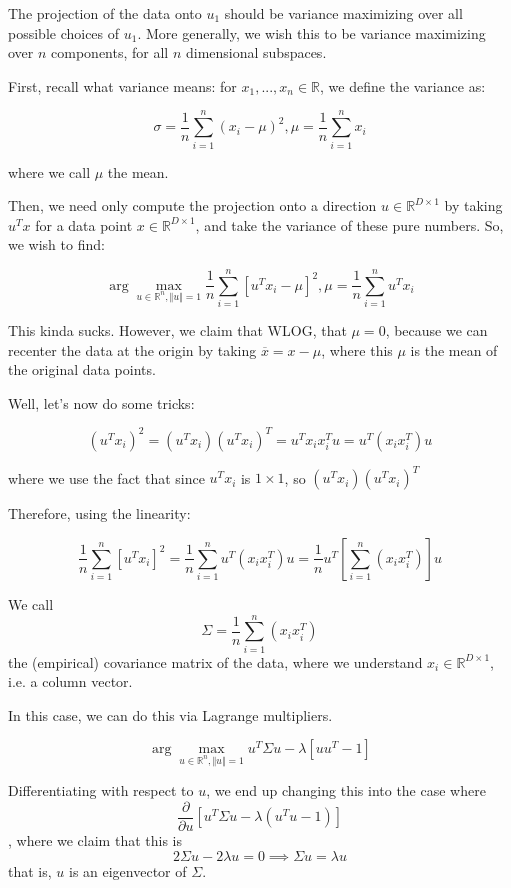 \documentclass[10pt]{article}
\begin{document}
The projection of the data onto $u_1$ should be variance maximizing over all possible choices of $u_1$. More generally, we wish this to be variance maximizing over $n$ components, for all $n$ dimensional subspaces.

First, recall what variance means: for $x_1,...,x_n \in \mathbb{R}$, we define the variance as:

$$ \sigma =  \frac{1}{n} \sum_{i=1}^n (x_i - \mu )^2,  \mu = \frac{1}{n} \sum_{i=1}^n x_i $$

where we call $\mu$ the mean. 

Then, we need only compute the projection onto a direction $u \in \mathbb{R}^{D \times 1}$ by taking $u^T x$ for a data point $x \in \mathbb{R}^{D \times 1}$, and take the variance of these pure numbers. So, we wish to find:

$$ \arg\max_{u \in \mathbb{R}^n, \Vert u \Vert = 1} \frac{1}{n} \sum_{i=1}^n [u^T x_i - \mu ]^2, \mu = \frac{1}{n} \sum_{i=1}^n u^T x_i $$

This kinda sucks. However, we claim that WLOG, that $\mu = 0$, because we can recenter the data at the origin by taking $\overline{x} = x - \mu$, where this $\mu$ is the mean of the original data points.

Well, let’s now do some tricks:

$$ (u^T x_i)^2  = (u^T x_i )(u^T x_i)^T = u^T x_i x_i^T u = u^T (x_i x_i^T) u$$

where we use the fact that since $u^T x_i$ is $1 \times 1$, so $(u^T x_i )(u^T x_i)^T$

Therefore, using the linearity:

$$  \frac{1}{n} \sum_{i=1}^n [u^T x_i ]^2 =  \frac{1}{n} \sum_{i=1}^n  u^T (x_i x_i^T) u = \frac{1}{n} u^T \left[ \sum_{i=1}^n (x_i x_i^T) \right] u $$

We call $$ \Sigma = \frac{1}{n} \sum_{i=1}^n (x_i x_i^T)$$ the (empirical) covariance matrix of the data, where we understand $x_i \in \mathbb{R}^{D \times 1}$, i.e. a column vector.

In this case, we can do this via Lagrange multipliers.

$$ \arg\max_{u \in \mathbb{R}^n, \Vert u \Vert = 1} u^T \Sigma u - \lambda \left[ u u^T - 1 \right] $$

Differentiating with respect to $u$, we end up changing this into the case where $$\frac{\partial}{\partial u} \left[ u^T \Sigma u - \lambda (u^T u - 1) \right]$$, where we claim that this is $$ 2 \Sigma u - 2\lambda u = 0 \implies \Sigma u = \lambda u$$ that is, $u$ is an eigenvector of $\Sigma$.
\end{document}
